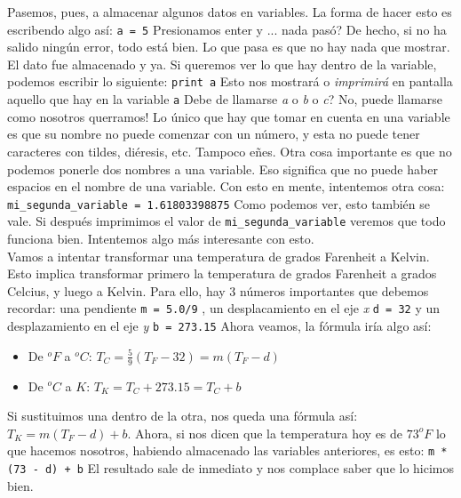 \documentclass[10pt,letterpaper]{article}
\newcommand{\inlinecode}[1]{
\colorbox{light-gray}{\texttt{#1}}
}
\begin{document}
Pasemos, pues, a almacenar algunos datos en variables. La forma de hacer esto es escribendo algo as\'i: \inlinecode{a = 5} Presionamos enter y ... nada pas\'o? De hecho, si no ha salido ning\'un error, todo est\'a bien. Lo que pasa es que no hay nada que mostrar. El dato fue almacenado y ya. Si queremos ver lo que hay dentro de la variable, podemos escribir lo siguiente: \inlinecode{print a} Esto nos mostrar\'a o \emph{imprimir\'a} en pantalla aquello que hay en la variable \inlinecode{a} Debe de llamarse \emph{a} o \emph{b} o \emph{c}? No, puede llamarse como nosotros querramos! Lo \'unico que hay que tomar en cuenta en una variable es que su nombre no puede comenzar con un n\'umero, y esta no puede tener caracteres con tildes, di\'eresis, etc. Tampoco e\~nes. Otra cosa importante es que no podemos ponerle dos nombres a una variable. Eso significa que no puede haber espacios en el nombre de una variable. Con esto en mente, intentemos otra cosa: \inlinecode{mi\_segunda\_variable = 1.61803398875} Como podemos ver, esto tambi\'en se vale. Si despu\'es imprimimos el valor de \inlinecode{mi\_segunda\_variable} veremos que todo funciona bien. Intentemos algo m\'as interesante con esto.\\

Vamos a intentar transformar una temperatura de grados Farenheit a Kelvin. Esto implica transformar primero la temperatura de grados Farenheit a grados Celcius, y luego a Kelvin. Para ello, hay 3 n\'umeros importantes que debemos recordar: una pendiente \inlinecode{m = 5.0/9}, un desplacamiento en el eje \emph{x} \inlinecode{d = 32} y un desplazamiento en el eje \emph{y} \inlinecode{b = 273.15} Ahora veamos, la f\'ormula ir\'ia algo as\'i:

\begin{itemize}
\item De $^o F$ a $^o C$:\hspace*{1cm} $T_{C} = \frac{5}{9} \left( T_{F} - 32 \right) = m \left( T_{F} - d \right)$
\item De $^o C$ a $K$:\hspace*{1cm} $T_{K} = T_{C} + 273.15 = T_{C} + b$
\end{itemize}

Si sustituimos una dentro de la otra, nos queda una f\'ormula as\'i: $T_{K} = m \left( T_{F} - d \right) + b$. Ahora, si nos dicen que la temperatura hoy es de $73^o F$ lo que hacemos nosotros, habiendo almacenado las variables anteriores, es esto: \inlinecode{m * (73 - d) + b} El resultado sale de inmediato y nos complace saber que lo hicimos bien.\\
\end{document}

